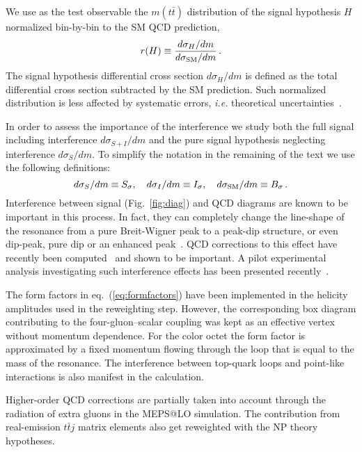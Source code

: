 \documentclass[aps,prd,amsmath,amssymb,superscriptaddress, preprintnumbers,preprint,nofootinbib,a4paper]{revtex4}
\def\eq#1{{eq.~(\ref{#1})}}
\begin{document}
We use as the test observable the 
$m(t\bar{t})$ distribution of the signal hypothesis $H$ normalized bin-by-bin to the SM QCD prediction,
\begin{equation}
r(H)\equiv\frac{d\sigma_H/dm}{d\sigma_{\rm SM}/dm}\,.
\label{eq:r}
\end{equation}
The signal hypothesis differential cross section $d\sigma_H/dm$ is defined as the total differential cross section subtracted by the SM prediction. 
Such normalized distribution is less affected by systematic errors, \emph{i.e.} theoretical uncertainties~\cite{Czakon:2017wor}. 

In order to assess the importance of the interference we study both the full signal including interference $d\sigma_{S+I}/dm$ and the pure signal hypothesis neglecting interference $d\sigma_S/dm$.
To simplify the notation in the remaining of the text we use the following definitions:
\begin{equation}
d\sigma_S/dm\equiv S_\sigma,\quad d\sigma_I/dm\equiv I_\sigma, \quad d\sigma_{\rm SM}/dm\equiv B_\sigma\,.
\end{equation}
Interference between signal (Fig.~\ref{fig:diag})  and QCD diagrams are known to be important in this process.  In fact,
they can completely change the line-shape of the resonance from a pure Breit-Wigner peak to a peak-dip structure, or
even dip-peak, pure dip or an enhanced peak~\cite{Gaemers:1984sj,Dicus:1994bm,Frederix:2007gi,Gori:2016zto,Jung:2015gta,Djouadi:2016ack}. QCD corrections to this effect have recently been computed~\cite{Bernreuther:2015fts,Hespel:2016qaf,BuarqueFranzosi:2017jrj} and shown to be important.
A pilot experimental analysis investigating such interference effects has been presented recently~\cite{Aaboud:2017hnm}.

The form factors in \eq{eq:formfactors} have been implemented in the helicity amplitudes used in the reweighting step.
However, the corresponding box diagram contributing to the four-gluon--scalar coupling was kept as an effective vertex without
momentum dependence. For the color octet the form factor is approximated by a fixed momentum flowing through the loop
that is equal to the mass of the resonance. The interference between top-quark loops and point-like interactions is also
manifest in the calculation.

Higher-order QCD corrections are partially taken into account through the radiation of extra gluons in the MEPS@LO simulation.
The contribution from real-emission $t\bar{t}j$ matrix elements also get reweighted with the NP theory hypotheses.
 
\end{document}
